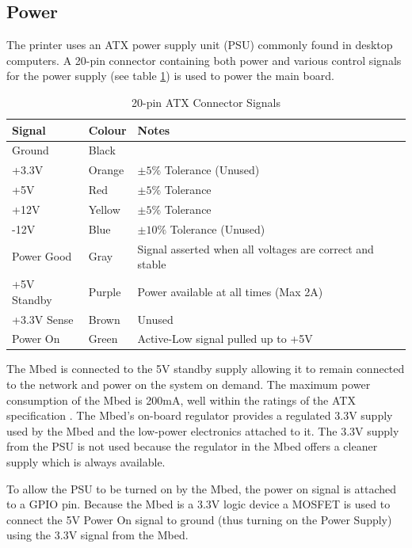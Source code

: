 		\subsection{Power}
			
			The printer uses an ATX power supply unit (PSU) commonly found in desktop
			computers. A 20-pin connector containing both power and various control
			signals for the power supply (see table \ref{tab:atxConnectors}) is used
			to power the main board.
			
			\begin{table}[here]
				\centering
				\begin{tabular}{l l l}
					\toprule
					Signal & Colour & Notes\\
					\midrule
					Ground & Black  & \\
					+3.3V  & Orange & $\pm5\%$  Tolerance (Unused) \\
					+5V    & Red    & $\pm5\%$  Tolerance \\
					+12V   & Yellow & $\pm5\%$  Tolerance \\
					-12V   & Blue   & $\pm10\%$ Tolerance (Unused) \\
					\addlinespace
					Power Good  & Gray   & Signal asserted when all voltages are correct
					                       and stable \\
					+5V Standby & Purple & Power available at all times (Max 2A) \\
					+3.3V Sense & Brown  & Unused \\
					Power On    & Green  & Active-Low signal pulled up to +5V \\
					
					\bottomrule
				\end{tabular}
				
				\caption{20-pin ATX Connector Signals\cite{ATX}}
				\label{tab:atxConnectors}
			\end{table}
			
			The Mbed is connected to the 5V standby supply allowing it to remain
			connected to the network and power on the system on demand. The maximum
			power consumption of the Mbed is 200mA, well within the ratings of the ATX
			specification \cite{mbed}. The Mbed's on-board regulator provides a
			regulated 3.3V supply used by the Mbed and the low-power electronics
			attached to it. The 3.3V supply from the PSU is not used because the
			regulator in the Mbed offers a cleaner supply which is always available.
			
			To allow the PSU to be turned on by the Mbed, the power on signal is
			attached to a GPIO pin.  Because the Mbed is a 3.3V logic device a MOSFET
			is used to connect the 5V Power On signal to ground (thus turning on the
			Power Supply) using the 3.3V signal from the Mbed.
		
